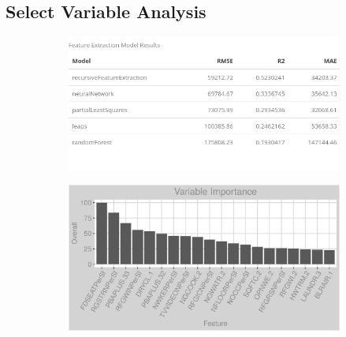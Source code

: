\subsection{Select Variable Analysis}
\label{appendix:natural_gas:sva}
\begin{figure}[h]
\centering
\begin{subfigure}{0.8\textwidth}
\centering
\includegraphics[width=.99\textwidth, height=0.3\textheight]{Images/natural_gas_psf_fe_summary.png}
\end{subfigure}
\begin{subfigure}{1\textwidth}
\centering
\includegraphics[width=.99\textwidth, height=0.45\textheight]{Images/natural_gas_psf_all_vars.png}
\end{subfigure}
\end{figure}
\FloatBarrier
\newpage
